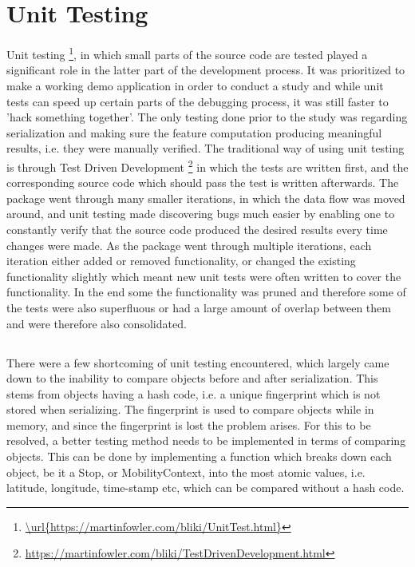 \section{Unit Testing}
Unit testing \footnote{\url{\url{https://martinfowler.com/bliki/UnitTest.html}}}, in which small parts of the source code are tested played a significant role in the latter part of the development process. It was prioritized to make a working demo application in order to conduct a study and while unit tests can speed up certain parts of the debugging process, it was still faster to 'hack something together'. The only testing done prior to the study was regarding serialization and making sure the feature computation producing meaningful results, i.e. they were manually verified. The traditional way of using unit testing is through Test Driven Development \footnote{
\url{https://martinfowler.com/bliki/TestDrivenDevelopment.html}} in which the tests are written first, and the corresponding source code which should pass the test is written afterwards. The package went through many smaller iterations, in which the data flow was moved around, and unit testing made discovering bugs much easier by enabling one to constantly verify that the source code produced the desired results every time changes were made. As the package went through multiple iterations, each iteration either added or removed functionality, or changed the existing functionality slightly which meant new unit tests were often written to cover the functionality. In the end some the functionality was pruned and therefore some of the tests were also superfluous or had a large amount of overlap between them and were therefore also consolidated. 

\subsection{}
There were a few shortcoming of unit testing encountered, which largely came down to the inability to compare objects before and after serialization. This stems from objects having a hash code, i.e. a unique fingerprint which is not stored when serializing. The fingerprint is used to compare objects while in memory, and since the fingerprint is lost the problem arises. For this to be resolved, a better testing method needs to be implemented in terms of comparing objects. This can be done by implementing a function which breaks down each object, be it a Stop, or MobilityContext, into the most atomic values, i.e. latitude, longitude, time-stamp etc, which can be compared without a hash code.

